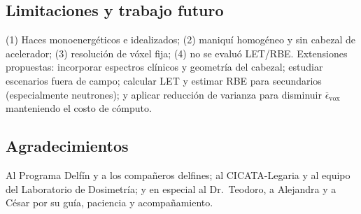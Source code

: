 \documentclass[11pt,a4paper]{article}
\begin{document}
\subsection*{Limitaciones y trabajo futuro}
(1) Haces monoenergéticos e idealizados; (2) maniquí homogéneo y sin cabezal de
acelerador; (3) resolución de vóxel fija; (4) no se evaluó LET/RBE. Extensiones
propuestas: incorporar espectros clínicos y geometría del cabezal; estudiar
escenarios fuera de campo; calcular LET y estimar RBE para secundarios
(especialmente neutrones); y aplicar reducción de varianza para disminuir
\(\overline{\epsilon}_{\text{vox}}\) manteniendo el costo de cómputo.

\subsection*{Agradecimientos}
Al Programa Delfín y a los compañeros delfines; al CICATA-Legaria y al equipo del
Laboratorio de Dosimetría; y en especial al Dr.\ Teodoro, a Alejandra y a César por
su guía, paciencia y acompañamiento.



\end{document}
